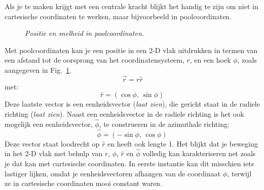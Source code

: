 Als je te maken krijgt met een centrale kracht blijkt het handig te zijn om niet in cartesische 
coordinaten te werken, maar bijvoorbeeld in poolcoordinaten. 
 \begin{figure}[htbp]
\begin{center}
\caption{{\it Positie en snelheid in poolcoordinaten.}}
\label{fig:pool}
\end{center}
\end{figure} 
Met poolcoordinaten kan je 
een positie in een 2-D vlak uitdrukken in termen van een afstand tot de oorsprong van het 
coordinatensysteem, $r$, en een hoek $\phi$, zoals aangegeven in Fig.~\ref{fig:pool}.  
\begin{equation}
\vec{r} = r \hat{r}
\end{equation}
met:
\begin{equation}
\hat{r} = (\cos\phi,\,\sin\phi)
\end{equation}
Deze laatste vector is een eenheidsvector ({\it laat zien}), die gericht staat in de radiele
richting ({\it laat zien}).  Naast een eenheidsvector in de radiele richting is het ook 
mogelijk een eenheidsvector, $\hat{\phi}$, te construeren in de azimuthale richting:
\begin{equation}
\hat{\phi} = (-\sin\phi,\,\cos\phi)
\end{equation}
Deze vector staat loodrecht op $\hat{r}$ en heeft ook lengte 1. Het blijkt dat je beweging
in het 2-D vlak met behulp van $r$, $\phi$, $\hat{r}$ en $\hat{\phi}$ volledig kan 
karakteriseren net zoals je dat kan met cartesische coordinaten. In eerste instantie kan
dit misschien iets lastiger lijken, omdat je eenheidsvectoren afhangen van de coordinaat $\phi$,
terwijl ze in cartesische coordinaten mooi constant waren. 

